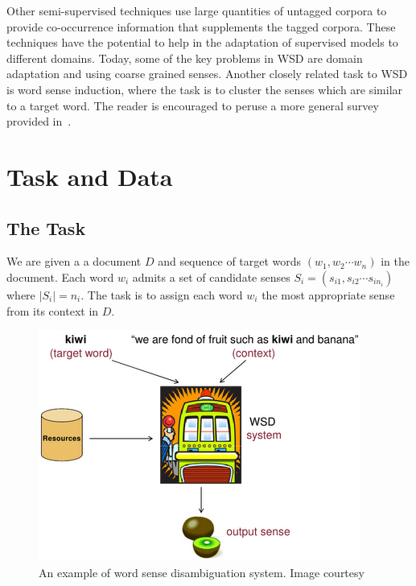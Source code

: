 \documentclass[12pt,letterpaper]{article}
\newcommand{\blue}[1]{\textcolor{RoyalBlue}{#1}}
\newcommand{\instructions}[1]{\blue{\textit{#1}}}
\begin{document}

Other semi-supervised techniques use large quantities of untagged corpora to provide co-occurrence information that supplements the tagged corpora. These techniques have the potential to help in the adaptation of supervised models to different domains. Today, some of the key problems in WSD are domain adaptation and using coarse grained senses. Another closely related task to WSD is word sense induction, where the task is to cluster the senses which are similar to a target word. The reader is encouraged to peruse a more general  survey provided in~\cite{navigli2009word}. 

\section{Task and Data}
\label{sec:taskAndData}

\subsection{The Task}
\label{sec:task}
We are given a a document $D$ and sequence of target words $(w_1,w_2 \cdots w_n)$ in the document. Each word $w_i$ admits a set of candidate senses $S_i=(s_{i1},s_{i2} \cdots s_{in_i})$ where $|S_i|= n_i$. The task is to assign each word $w_i$ the most appropriate sense from its context in $D$. 
\begin{figure}[H]
\centering
\includegraphics[scale=0.8]{wsd.png}
\caption{An example of word sense disambiguation system. Image courtesy ~\protect\cite{navilgiblog}}
\end{figure}
\end{document}
